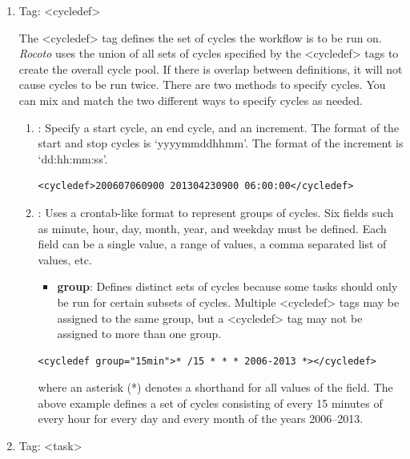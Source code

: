 \documentclass[11pt,fleqn]{report}              %
\begin{document}
\begin{enumerate}
\item Tag: <cycledef>

The <cycledef> tag defines the set of cycles the workflow is to be run on. {\it Rocoto} uses the union of all sets of cycles specified by the <cycledef> tags to create the overall cycle pool. If there is overlap between definitions, it will not cause cycles to be run twice. There are two methods to specify cycles. You can mix and match the two different ways to specify cycles as needed.

\begin{enumerate}
\item {: Specify a start cycle, an end cycle, and an increment. The format of the start and stop cycles is `yyyymmddhhmm'. The format of the increment is `dd:hh:mm:ss'.}

\lstset{language=XML}   
\begin{lstlisting}[frame=trBL]
<cycledef>200607060900 201304230900 06:00:00</cycledef>
\end{lstlisting}

\item {: Uses a crontab-like format to represent groups of cycles. Six fields such as minute, hour, day, month, year, and weekday must be defined. Each field can be a single value, a range of values, a comma separated list of values, etc.}

\begin{itemize}
\item {\bf group}: Defines distinct sets of cycles because some tasks should only be run for certain subsets of cycles. Multiple <cycledef> tags may be assigned to the same group, but a <cycledef> tag may not be assigned to more than one group.  
\end{itemize}

\lstset{language=XML}   
\begin{lstlisting}[frame=trBL]
<cycledef group="15min">* /15 * * * 2006-2013 *></cycledef>
\end{lstlisting}
where an asterisk (*) denotes a shorthand for all values of the field. The above example defines a set of cycles consisting of every 15 minutes of every hour for every day and every month of the years 2006--2013.

\end{enumerate}


\item Tag: <task>


\end{enumerate}
\end{document}
